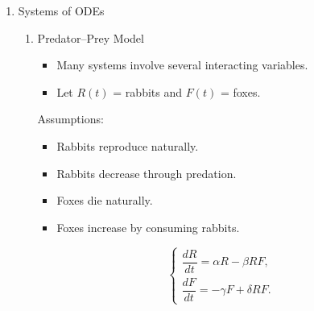 \documentclass{article}
\begin{document}
\begin{enumerate}
\begin{enumerate}
\begin{itemize}
\item Describes how $y$ changes.
\item Much of this course studies equations of this form.
\item Initial value problem case (IVP).
\item Independent variable: usually time $t$.
\item Dependent variable: the unknown function, e.g. $y(t)$.
\item Variables vs. parameters
\begin{itemize}
\item Variables change during the problem ($t$, $y$).
\item Parameters are fixed constants that describe the system ($k$, $N$, ...).
\item Changing a parameter gives a different model.
\end{itemize}
\end{itemize}

\end{enumerate}

\item Systems of ODEs

\begin{enumerate}

\item Predator--Prey Model

\begin{itemize}
\item Many systems involve several interacting variables.
\item Let $R(t)$ = rabbits and $F(t)$ = foxes.
\end{itemize}

Assumptions:
\begin{itemize}
\item Rabbits reproduce naturally.
\item Rabbits decrease through predation.
\item Foxes die naturally.
\item Foxes increase by consuming rabbits.
\end{itemize}

\[
\begin{cases}
\dfrac{dR}{dt}=\alpha R-\beta RF,\\[1ex]
\dfrac{dF}{dt}=-\gamma F+\delta RF.
\end{cases}
\]


\end{enumerate}
\end{enumerate}
\end{document}
